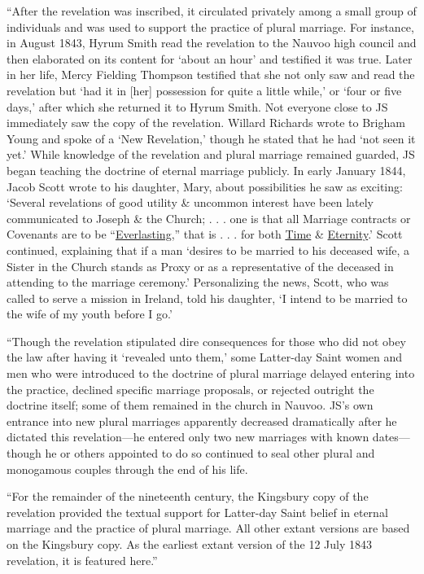 			``After the revelation was inscribed, it circulated privately among a small group of individuals and was used to support the practice of plural marriage. For instance, in August 1843, Hyrum Smith read the revelation to the Nauvoo high council and then elaborated on its content for `about an hour' and testified it was true. Later in her life, Mercy Fielding Thompson testified that she not only saw and read the revelation but `had it in [her] possession for quite a little while,' or `four or five days,' after which she returned it to Hyrum Smith. Not everyone close to JS immediately saw the copy of the revelation. Willard Richards wrote to Brigham Young and spoke of a `New Revelation,' though he stated that he had `not seen it yet.' While knowledge of the revelation and plural marriage remained guarded, JS began teaching the doctrine of eternal marriage publicly. In early January 1844, Jacob Scott wrote to his daughter, Mary, about possibilities he saw as exciting: `Several revelations of good utility \& uncommon interest have been lately communicated to Joseph \& the Church; . . . one is that all Marriage contracts or Covenants are to be ``\uline{Everlasting},'' that is . . . for both \uline{Time} \& \uline{Eternity}.' Scott continued, explaining that if a man `desires to be married to his deceased wife, a Sister in the Church stands as Proxy or as a representative of the deceased in attending to the marriage ceremony.' Personalizing the news, Scott, who was called to serve a mission in Ireland, told his daughter, `I intend to be married to the wife of my youth before I go.'

			``Though the revelation stipulated dire consequences for those who did not obey the law after having it `revealed unto them,' some Latter-day Saint women and men who were introduced to the doctrine of plural marriage delayed entering into the practice, declined specific marriage proposals, or rejected outright the doctrine itself; some of them remained in the church in Nauvoo. JS's own entrance into new plural marriages apparently decreased dramatically after he dictated this revelation---he entered only two new marriages with known dates---though he or others appointed to do so continued to seal other plural and monogamous couples through the end of his life.

			``For the remainder of the nineteenth century, the Kingsbury copy of the revelation provided the textual support for Latter-day Saint belief in eternal marriage and the practice of plural marriage. All other extant versions are based on the Kingsbury copy. As the earliest extant version of the 12 July 1843 revelation, it is featured here.''
			
